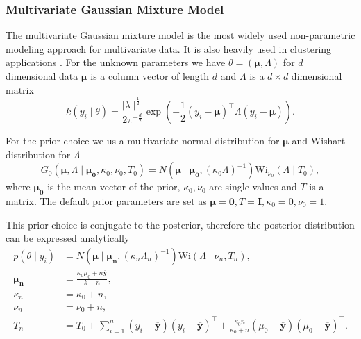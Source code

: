 \documentclass[nojss]{jss}
\begin{document}
\subsubsection{Multivariate Gaussian Mixture Model}
The multivariate Gaussian mixture model is the most widely used non-parametric modeling approach for multivariate data. It is also heavily used in clustering applications \citep{maceachern_estimating_1998}. For the unknown parameters we have $\theta = ( \boldsymbol{\mu}, \Lambda )$ for $d$ dimensional data $\boldsymbol{\mu}$ is a column vector of length $d$ and $\Lambda$ is a $d \times d$ dimensional matrix
\begin{equation}
k(y_i \mid \theta) = \frac{\mid \lambda \mid ^{\frac{1}{2}}}{2 \pi ^{- \frac{d}{2}}} \exp \left( - \frac{1}{2} (y_i - \boldsymbol{\mu})^\top \Lambda (y_i - \boldsymbol{\mu})  \right).
\end{equation}

For the prior choice we us a multivariate normal distribution for $\boldsymbol{\mu}$ and Wishart distribution for $\Lambda$
\begin{equation}
G_0 (\boldsymbol{\mu} , \Lambda \mid  \boldsymbol{\mu _0} , \kappa _0, \nu _0, T_0)  = N ( \boldsymbol{\mu} \mid \boldsymbol{\mu _0} , (\kappa _0 \Lambda )^{-1} ) \text{Wi} _{\nu _0} (\Lambda \mid T_0),
\end{equation}
where $\boldsymbol{\mu _0}$ is the mean vector of the prior, $\kappa _0, \nu _0$ are single values and $T$ is a matrix. The default prior parameters are set as $\boldsymbol{\mu} = \mathbf{0}, T = \mathbf{I}, \kappa_0 = 0, \nu_0 = 1$.

This prior choice is conjugate to the posterior, therefore the posterior distribution can be expressed analytically
\begin{align*}
p(\theta \mid y_i ) & = N ( \boldsymbol{\mu} \mid \boldsymbol{\mu _n} , (\kappa _n \Lambda _n )^{-1}  ) \text{Wi} (\Lambda \mid \nu _n, T_n), \\
\boldsymbol{\mu _n} & = \frac{\kappa _0 \mu _0 + n \mathbf{\overline{{y}}}}{k + n}, \\
\kappa _n & = \kappa _0 + n, \\
\nu _n & = \nu _0 + n, \\
T_n & = T_0 + \sum _{i=1} ^n (y_i - \mathbf{\overline{{y}}}) ( y_i -  \mathbf{\overline{{y}}} ) ^\top + \frac{\kappa _0 n}{\kappa _0 + n} ( \mu _0 - \mathbf{\overline{{y}}} )( \mu _0 -  \mathbf{\overline{{y}}} ) ^\top.
\end{align*}
\end{document}
